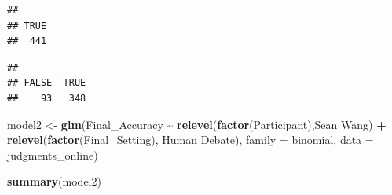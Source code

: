 \documentclass[
]{article}
\newenvironment{Shaded}{\begin{snugshade}}{\end{snugshade}}
\newcommand{\AttributeTok}[1]{\textcolor[rgb]{0.13,0.29,0.53}{#1}}
\newcommand{\FunctionTok}[1]{\textcolor[rgb]{0.13,0.29,0.53}{\textbf{#1}}}
\newcommand{\NormalTok}[1]{#1}
\newcommand{\OtherTok}[1]{\textcolor[rgb]{0.56,0.35,0.01}{#1}}
\newcommand{\SpecialCharTok}[1]{\textcolor[rgb]{0.81,0.36,0.00}{\textbf{#1}}}
\newcommand{\StringTok}[1]{\textcolor[rgb]{0.31,0.60,0.02}{#1}}
\begin{document}
\begin{verbatim}
## 
## TRUE 
##  441
\end{verbatim}

\begin{Shaded}
\end{Shaded}

\begin{verbatim}
## 
## FALSE  TRUE 
##    93   348
\end{verbatim}

\begin{Shaded}
\begin{Highlighting}[]
\NormalTok{model2 }\OtherTok{\textless{}{-}} \FunctionTok{glm}\NormalTok{(Final\_Accuracy }\SpecialCharTok{\textasciitilde{}} \FunctionTok{relevel}\NormalTok{(}\FunctionTok{factor}\NormalTok{(Participant),}\StringTok{\textquotesingle{}Sean Wang\textquotesingle{}}\NormalTok{) }\SpecialCharTok{+} \FunctionTok{relevel}\NormalTok{(}\FunctionTok{factor}\NormalTok{(Final\_Setting), }\StringTok{\textquotesingle{}Human Debate\textquotesingle{}}\NormalTok{), }\AttributeTok{family =} \StringTok{\textquotesingle{}binomial\textquotesingle{}}\NormalTok{, }\AttributeTok{data =}\NormalTok{ judgments\_online)}

\FunctionTok{summary}\NormalTok{(model2)}
\end{Highlighting}
\end{Shaded}
\end{document}
